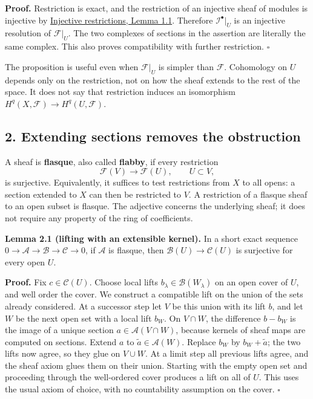 \documentclass[11pt]{article}
\begin{document}
\textbf{Proof.} Restriction is exact, and the restriction of an
injective sheaf of modules is injective by
\href{../derived-categories-and-sheaf-operations/injective-modules-and-bounded-below-derived-functors.html\#1-extending-maps-and-extending-sections}{Injective
restrictions, Lemma 1.1}. Therefore \(\mathcal I^\bullet|_U\) is an
injective resolution of \(\mathcal F|_U\). The two complexes of sections
in the assertion are literally the same complex. This also proves
compatibility with further restriction. \(\square\)

The proposition is useful even when \(\mathcal F|_U\) is simpler than
\(\mathcal F\). Cohomology on \(U\) depends only on the restriction, not
on how the sheaf extends to the rest of the space. It does not say that
restriction induces an isomorphism
\(H^q(X,\mathcal F)\to H^q(U,\mathcal F)\).

\subsection{2. Extending sections removes the
obstruction}\label{extending-sections-removes-the-obstruction}

A sheaf is \textbf{flasque}, also called \textbf{flabby}, if every
restriction \[
\mathcal F(V)\longrightarrow\mathcal F(U),\qquad U\subset V,
\] is surjective. Equivalently, it suffices to test restrictions from
\(X\) to all opens: a section extended to \(X\) can then be restricted
to \(V\). A restriction of a flasque sheaf to an open subset is flasque.
The adjective concerns the underlying sheaf; it does not require any
property of the ring of coefficients.

\textbf{Lemma 2.1 (lifting with an extensible kernel).} In a short exact
sequence \(0\to\mathcal A\to\mathcal B\to\mathcal C\to0\), if
\(\mathcal A\) is flasque, then \(\mathcal B(U)\to\mathcal C(U)\) is
surjective for every open \(U\).

\textbf{Proof.} Fix \(c\in\mathcal C(U)\). Choose local lifts
\(b_\lambda\in\mathcal B(W_\lambda)\) on an open cover of \(U\), and
well order the cover. We construct a compatible lift on the union of the
sets already considered. At a successor step let \(V\) be this union
with its lift \(b\), and let \(W\) be the next open set with a local
lift \(b_W\). On \(V\cap W\), the difference \(b-b_W\) is the image of a
unique section \(a\in\mathcal A(V\cap W)\), because kernels of sheaf
maps are computed on sections. Extend \(a\) to
\(\widetilde a\in\mathcal A(W)\). Replace \(b_W\) by
\(b_W+\widetilde a\); the two lifts now agree, so they glue on
\(V\cup W\). At a limit step all previous lifts agree, and the sheaf
axiom glues them on their union. Starting with the empty open set and
proceeding through the well-ordered cover produces a lift on all of
\(U\). This uses the usual axiom of choice, with no countability
assumption on the cover. \(\square\)
\end{document}
